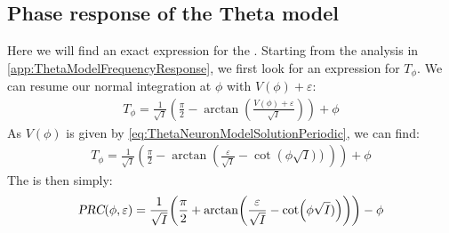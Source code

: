 \subsection{Phase response of the Theta model} \label{app:ThetaModelPhaseResponse}
Here we will find an exact expression for the \PRC. Starting from the analysis in \ref{app:ThetaModelFrequencyResponse}, we first look for an expression for $T_{\phi}$. We can resume our normal integration at $\phi$ with $V \left( \phi \right) + \varepsilon$:
\begin{align*}
T_{\phi}=\frac{1}{\sqrt{I}}\left(\frac{\pi}{2}-\arctan \left(\frac{V(\phi)+\varepsilon}{\sqrt{I}}\right)\right)+\phi
\end{align*}
As $V(\phi)$ is given by \eqref{eq:ThetaNeuronModelSolutionPeriodic}, we can find:
\begin{align*}
T_{\phi} = \frac{1}{\sqrt{I}}\left(\frac{\pi}{2} - \arctan \left(\frac{\varepsilon}{\sqrt{I}} - \cot \left(\phi\sqrt{I})\right)\right)\right)+\phi
\end{align*}
The \PRC is then simply:
\begin{align*}
\PRC(\phi, \varepsilon) = \frac{1}{\sqrt{I}}\left(\frac{\pi}{2} + \arctan \left(\frac{\varepsilon}{\sqrt{I}} - \cot \left(\phi \sqrt{I})\right)\right)\right) - \phi
\end{align*}


